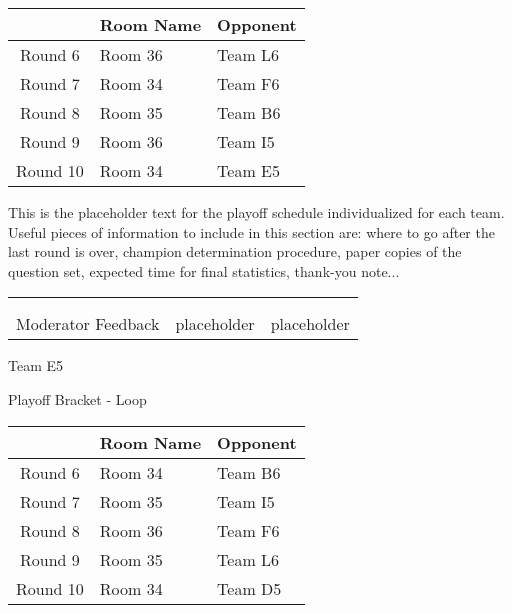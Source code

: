 \documentclass{article}%
\begin{document}
\vspace*{4pt}%
%
\begin{tabularx}{\textwidth}{|c|Y|Y|}%
\hline%
&Room Name&Opponent\\%
\hline%
Round 6&Room 36&Team L6\\%
Round 7&Room 34&Team F6\\%
Round 8&Room 35&Team B6\\%
Round 9&Room 36&Team I5\\%
Round 10&Room 34&Team E5\\%
\hline%
\end{tabularx}%
\vspace*{30pt}%
\linebreak%
This is the placeholder text for the playoff schedule individualized for each team. Useful pieces of information to include in this section are: where to go after the last round is over, champion determination procedure, paper copies of the question set, expected time for final statistics, thank{-}you note...%
\vspace*{30pt}%
\newline%
%
\begin{tabularx}{\textwidth}{YYY}%
  &  &  \\%
\\%
Moderator Feedback&placeholder&placeholder\\%
\end{tabularx}%
\newpage%
\begin{center}%
\begin{Huge}%
Team E5%
\end{Huge}%
\vspace*{12pt}%
\linebreak%
\begin{Large}%
Playoff Bracket {-} Loop%
\end{Large}%
\end{center}%
\vspace*{4pt}%
%
\begin{tabularx}{\textwidth}{|c|Y|Y|}%
\hline%
&Room Name&Opponent\\%
\hline%
Round 6&Room 34&Team B6\\%
Round 7&Room 35&Team I5\\%
Round 8&Room 36&Team F6\\%
Round 9&Room 35&Team L6\\%
Round 10&Room 34&Team D5\\%
\hline%
\end{tabularx}%
\end{document}
